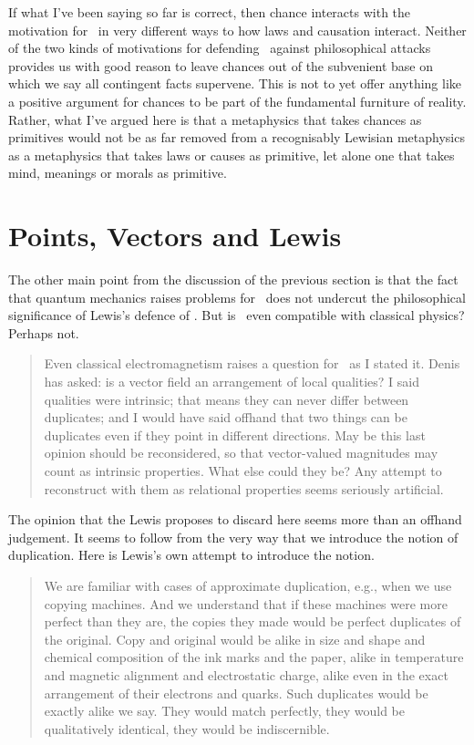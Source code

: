 If what I've been saying so far is correct, then chance interacts with the motivation for \HS\ in very different ways to how laws and causation interact. Neither of the two kinds of motivations for defending \HS\ against philosophical attacks provides us with good reason to leave chances out of the subvenient base on which we say all contingent facts supervene. This is not to yet offer anything like a positive argument for chances to be part of the fundamental furniture of reality. Rather, what I've argued here is that a metaphysics that takes chances as primitives would not be as far removed from a recognisably Lewisian metaphysics as a metaphysics that takes laws or causes as primitive, let alone one that takes mind, meanings or morals as primitive.

\section{Points, Vectors and Lewis}
The other main point from the discussion of the previous section is that the fact that quantum mechanics raises problems for \HS\  does not undercut the philosophical significance of Lewis's defence of \HS. But is \HS\ even  compatible with classical physics? Perhaps not.

\begin{quote}
Even classical electromagnetism raises a question for \HS\  as I stated it. Denis \citet{Robinson1989}  has asked: is a vector field an arrangement of local qualities? I said qualities were intrinsic; that means they can never differ between duplicates; and I would have said offhand that two things can be duplicates even if they point in different directions.  May be this last opinion should be reconsidered, so that vector-valued magnitudes may count as intrinsic properties. What else could they be? Any attempt to reconstruct with them as relational properties seems seriously artificial. \citep[474]{Lewis1994a}
\end{quote}

\noindent  The opinion that the Lewis proposes to discard here seems more than an offhand judgement. It seems to follow from the very way that we introduce the notion of duplication. Here is Lewis's own  attempt to introduce the notion.

\begin{quote}
We are familiar with cases of approximate duplication, e.g., when we use copying machines. And we understand that if these machines were more perfect than they are, the copies they made would be perfect duplicates of the original. Copy and original would be alike in size and shape and chemical composition of the ink marks and the paper, alike in temperature and magnetic alignment and electrostatic charge, alike even in the exact arrangement of their electrons and quarks. Such duplicates would be exactly alike we say. They would match perfectly, they would be qualitatively identical, they would be indiscernible. \citep[355]{Lewis1983e}
\end{quote}

